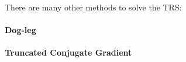 There are many other methods to solve the TRS:
\paragraph{Dog-leg}



\paragraph{Truncated Conjugate Gradient}





















